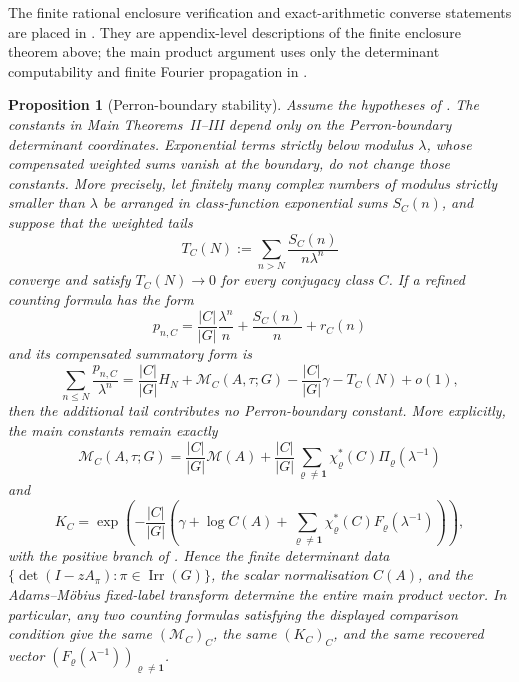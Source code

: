 \documentclass[11pt,a4paper]{amsart}
\theoremstyle{plain}
\newtheorem{proposition}[theorem]{Proposition}
\theoremstyle{definition}
\theoremstyle{remark}
\DeclareMathOperator{\Irr}{Irr}
\begin{document}
The finite rational enclosure verification and exact-arithmetic converse statements are placed in
.
They are appendix-level descriptions of the finite enclosure theorem above;
the main product argument uses only the determinant computability and finite
Fourier propagation in
.


\begin{proposition}[Perron-boundary stability]
  \label{prop:main-chain-secondary-noninterference}
  \label{prop:perron-boundary-stability}
  Assume the hypotheses of .  The constants in
  Main Theorems~II--III depend only on the Perron-boundary determinant
  coordinates.  Exponential terms strictly below modulus \(\lambda\), whose
  compensated weighted sums vanish at the boundary, do not change those
  constants.
  More precisely, let finitely many complex numbers of modulus strictly smaller
  than \(\lambda\) be arranged in class-function exponential sums \(S_C(n)\),
  and suppose that the weighted tails
  \[
    T_C(N):=\sum_{n>N}\frac{S_C(n)}{n\lambda^n}
  \]
  converge and satisfy \(T_C(N)\to0\) for every conjugacy class \(C\).  If a
  refined counting formula has the form
  \begin{equation}\label{eq:secondary-noninterference-refined-count}
    p_{n,C}
    =
    \frac{|C|}{|G|}\frac{\lambda^n}{n}
    +\frac{S_C(n)}{n}+r_C(n)
  \end{equation}
  and its compensated summatory form is
  \begin{equation}\label{eq:secondary-noninterference-refined-sum}
    \sum_{n\le N}\frac{p_{n,C}}{\lambda^n}
    =
    \frac{|C|}{|G|}H_N
    +\mathcal M_C(A,\tau;G)-\frac{|C|}{|G|}\gamma
    -T_C(N)+o(1),
  \end{equation}
  then the additional tail contributes no Perron-boundary constant.  More
  explicitly, the main constants remain exactly
  \begin{equation}\label{eq:secondary-noninterference-mc}
    \mathcal M_C(A,\tau;G)
    =
    \frac{|C|}{|G|}\mathcal M(A)
    +\frac{|C|}{|G|}
      \sum_{\varrho\neq\mathbf1}
        \chi_\varrho^\ast(C)\Pi_\varrho(\lambda^{-1})
  \end{equation}
  and
  \begin{equation}\label{eq:secondary-noninterference-k}
    K_C=
    \exp\!\left(
      -\frac{|C|}{|G|}
      \left(
        \gamma+\log C(A)
        +\sum_{\varrho\neq\mathbf1}
          \chi_\varrho^\ast(C)F_\varrho(\lambda^{-1})
      \right)
    \right),
  \end{equation}
  with the positive branch of .  Hence
  the finite determinant data
  \(\{\det(I-zA_\pi):\pi\in\Irr(G)\}\), the scalar normalisation \(C(A)\),
  and the Adams--M\"obius fixed-label transform determine the entire main
  product vector.  In particular, any two counting formulas satisfying the
  displayed comparison condition give the same \((\mathcal M_C)_C\), the same
  \((K_C)_C\), and the same recovered vector
  \((F_\varrho(\lambda^{-1}))_{\varrho\neq\mathbf1}\).
\end{proposition}
\end{document}
